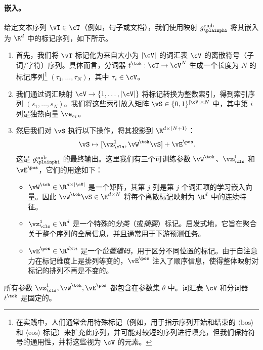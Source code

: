 \documentclass[../../book-main_zh.tex]{subfiles}
\begin{document}
\paragraph{嵌入。} 给定文本序列 \(\vT \in \cT\)（例如，句子或文档），我们使用映射 \(g_{\plainphi}^{\text{emb}}\) 将其嵌入为 \(\R^d\) 中的标记序列，如下所示。
\begin{enumerate}
    \item 首先，我们将 \(\vT\) 标记化为来自大小为 \(|\cV|\) 的词汇表 \(\cV\) 的离散符号（子词/字符）序列。具体而言，分词器 \(t^{\tok} : \cT \to \cV^{N}\) 生成一个长度为 \(N\) 的标记序列\footnote{在实践中，人们通常会用特殊标记（例如，用于指示序列开始和结束的 \(\langle \text{bos}\rangle\) 和 \(\langle \text{eos}\rangle\) 标记）来扩充此序列，并可能对较短的序列进行填充，但我们保持符号的通用性，并将这些视为 \(\cV\) 的元素。} \((\tau_{1},\dots,\tau_{N})\)，其中 \(\tau_i \in \cV\)。
    \item 我们通过词汇映射 \(\cV\to\{1,\dots,|\cV|\}\) 将标记转换为整数索引，得到索引序列 \((s_{1},\dots,s_{N})\)。我们将这些索引放入矩阵 \(\vS \in \{0,1\}^{|\cV|\times N}\) 中，其中第 \(i\) 列是独热向量 \(\ve_{s_i}\)。
    \item 然后我们对 \(\vS\) 执行以下操作，将其投影到 \(\R^{d \times (N+1)}\)：
        \begin{equation}
            \vS \mapsto [\vz_{\cls}^{1}, \vW^{\tok}\vS] + \vE^{\pos}.
        \end{equation}
        这是 \(g_{\plainphi}^{\text{emb}}\) 的最终输出。这里我们有三个可训练参数 \(\vW^{\tok}\)、\(\vz_{\cls}^{1}\) 和 \(\vE^{\pos}\)，它们的用途如下：
        \begin{itemize}
            \item \(\vW^{\tok} \in \R^{d \times |\cV|}\) 是一个矩阵，其第 \(j\) 列是第 \(j\) 个词汇项的学习嵌入向量。因此 \(\vW^{\tok}\vS
                \in \R^{d\times N}\) 将每个离散标记映射为 \(\R^{d}\) 中的连续特征。
            \item \(\vz_{\cls}^{1} \in \R^{d}\) 是一个特殊的\textit{分类}（或\textit{摘要}）标记。启发式地，它旨在聚合关于整个序列的全局信息，并且通常用于下游预测任务。
            \item \(\vE^{\pos} \in \R^{d \times n}\) 是一个\textit{位置编码}，用于区分不同位置的标记。由于自注意力在标记维度上是排列等变的，\(\vE^{\pos}\) 注入了顺序信息，使得整体映射对标记的排列不再是不变的。
        \end{itemize}
\end{enumerate}
所有参数 \(\vz_{\cls}^{1}, \vW^{\tok}, \vE^{\pos}\) 都包含在参数集 \(\theta\) 中。词汇表 \(\cV\) 和分词器 \(t^{\tok}\) 是固定的。 
\end{document}
